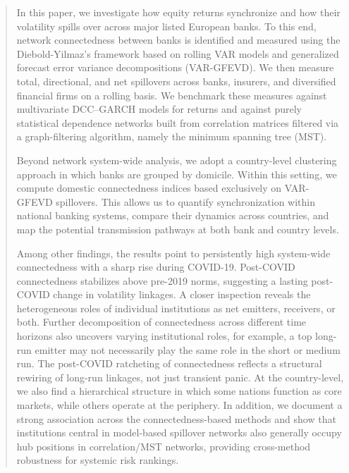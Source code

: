 \documentclass[12pt,a4paper]{article}
\begin{document}
\renewcommand{\abstractname}{\Large\bfseries Abstract}
\begin{abstract}


In this paper, we investigate how equity returns synchronize and how their volatility spills over across major listed European banks. To this end, network connectedness between banks is identified and measured using the Diebold-Yilmaz's framework based on rolling VAR models and generalized forecast error variance decompositions (VAR-GFEVD). We then measure total, directional, and net spillovers across banks, insurers, and diversified financial firms on a rolling basis.
We benchmark these measures against
multivariate DCC–GARCH models for returns and against purely statistical dependence networks built from correlation matrices filtered via a graph-filtering algorithm, namely the minimum spanning tree (MST).

Beyond network system-wide analysis, we adopt a country-level clustering approach in which banks are grouped by domicile. Within this setting, we compute domestic connectedness indices based exclusively on VAR-GFEVD spillovers. This allows us to quantify synchronization within national banking systems, compare their dynamics across countries, and map the potential transmission pathways at both bank and country levels.

Among other findings, the results point to persistently high system-wide connectedness with a sharp rise during COVID-19. Post-COVID connectedness stabilizes above pre-2019 norms, suggesting a lasting post-COVID change in volatility
linkages. A closer inspection reveals the heterogeneous roles of individual institutions as net emitters, receivers, or both. Further decomposition of connectedness across different time horizons also uncovers varying institutional roles, for example, a top long-run emitter may not necessarily play the same role in the short or medium run. The post-COVID ratcheting of connectedness reflects a structural rewiring of long-run linkages, not just transient panic.
At the country-level, we also find a hierarchical structure in which some nations function as core markets, while others operate at the periphery.
In addition, we document a strong association across the connectedness-based methods and show that institutions central in model-based spillover networks also generally occupy hub positions in correlation/MST networks, providing cross-method robustness for systemic risk rankings.


\end{abstract}
\end{document}
